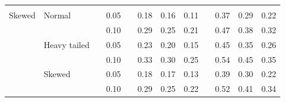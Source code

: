 \documentclass[12pt]{article} %
\begin{document}
\begin{table}[ht]
\begin{scriptsize}
\begin{center}
\begin{tabular}{ll p{.1cm} c p{.1cm} rrr p{.1cm} rrr}
             &&&&&&&&&&&\\
Skewed       & Normal       && 0.05 &&  0.18 & 0.16 & 0.11 && 0.37 & 0.29 & 0.22 \\ 
             &              && 0.10 &&  0.29 & 0.25 & 0.21 && 0.47 & 0.38 & 0.32 \\ 
             & Heavy tailed && 0.05 &&  0.23 & 0.20 & 0.15 && 0.45 & 0.35 & 0.26 \\ 
             &              && 0.10 &&  0.33 & 0.30 & 0.25 && 0.54 & 0.45 & 0.35 \\ 
             & Skewed       && 0.05 &&  0.18 & 0.17 & 0.13 && 0.39 & 0.30 & 0.22 \\ 
             &              && 0.10 &&  0.29 & 0.25 & 0.22 && 0.52 & 0.41 & 0.34 \\ 


\hline
\end{tabular}
\end{center}
\end{scriptsize}
\end{table}
\end{document}
